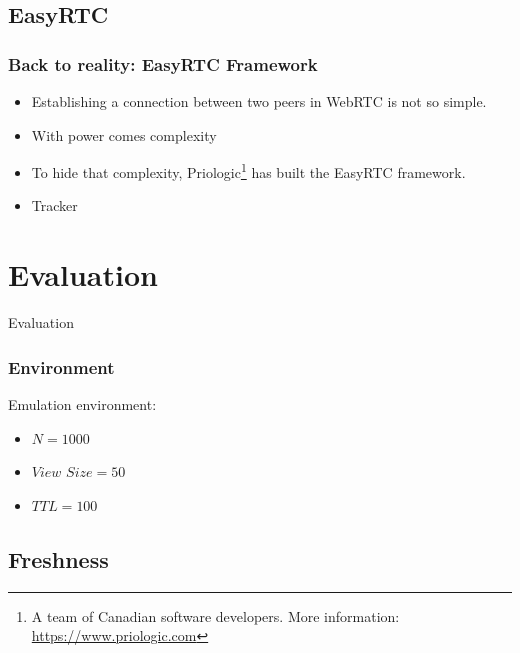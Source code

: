 \documentclass{beamer}
\begin{document}
\subsection{EasyRTC}

\begin{frame}\frametitle{Back to reality: EasyRTC Framework}
\begin{itemize}
  \item Establishing a connection between two peers in WebRTC is not so simple.
  \item With power comes complexity
  \item To hide that complexity, Priologic\footnote{A team of Canadian software developers. More information: \url{https://www.priologic.com}} has built the EasyRTC framework.
  \item Tracker
\end{itemize}
\end{frame}


\section{Evaluation}

\begin{frame}[c]
\Huge{\centerline{Evaluation}}

\end{frame}

\begin{frame}\frametitle{Environment}
Emulation environment:
\begin{itemize}
  \item $N = 1000$
  \item $View$ $Size = 50$
  \item $TTL = 100$
\end{itemize}
\end{frame}

\subsection{Freshness}
\end{document}
